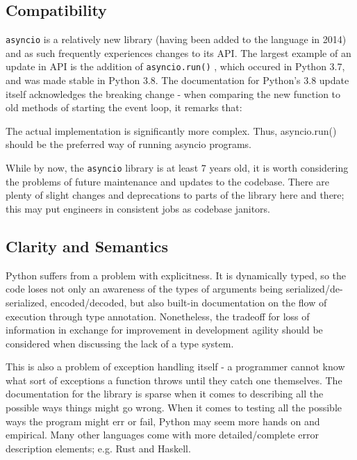 \documentclass[letterpaper,twocolumn,10pt]{article}
\newcommand{\code}[1]{
    \texttt{#1}
}
\begin{document}
\subsection{Compatibility}

\code{asyncio} is a relatively new library (having been added to the language in 2014) and as such
frequently experiences changes to its API.  The largest example of an update in API is the addition
of \code{asyncio.run()}, which occured in Python 3.7, and was made stable in Python 3.8.  The 
documentation for Python's 3.8 update itself acknowledges the breaking change - when comparing the new
function to old methods of starting the event loop, it remarks that:

\begin{displayquote}
    The actual implementation is significantly more complex. Thus, asyncio.run() should be the preferred way of running asyncio programs.
\end{displayquote}

While by now, the \code{asyncio} library is at least 7 years old, it is worth considering the problems of
future maintenance and updates to the codebase.  There are plenty of slight changes and deprecations to
parts of the library here and there; this may put engineers in consistent jobs as codebase janitors.


\subsection{Clarity and Semantics}

Python suffers from a problem with explicitness.  It is dynamically typed, so the code loses
not only an awareness of the types of arguments being serialized/de-serialized, encoded/decoded, but also
built-in documentation on the flow of execution through type annotation.  Nonetheless, the tradeoff for
loss of information in exchange for improvement in development agility should be considered when
discussing the lack of a type system.

This is also a problem of exception handling itself - a programmer cannot know what sort of exceptions a
function throws until they catch one themselves.  The documentation for the library is sparse when it
comes to describing all the possible ways things might go wrong.  When it comes to testing all the
possible ways the program might err or fail, Python may seem more hands on and empirical.  Many other
languages come with more detailed/complete error description elements; e.g. Rust and Haskell.
\end{document}
